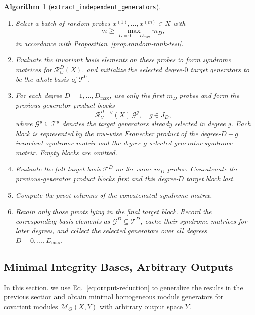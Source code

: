 \documentclass[11pt]{article}
\newcommand{\scG}{\mathcal{G}}
\newcommand{\scM}{\mathcal{M}}
\newcommand{\scR}{\mathcal{R}}
\newcommand{\scT}{\mathcal{T}}
\newtheorem{algorithm}[theorem]{Algorithm}
\theoremstyle{definition}
\begin{document}
\begin{algorithm}[\texttt{extract\_independent\_generators}]
\begin{enumerate}[label=\textbf{Step \arabic*.},leftmargin=2.8cm]
    \item Select a batch of random probes $x^{(1)},\dots,x^{(m)}\in X$ with
    \[
      m\ge \max_{D=0,\dots,D_{\max}} m_D,
    \]
    in accordance with Proposition~\ref{prop:random-rank-test}.

    \item Evaluate the invariant basis elements on these probes to form syndrome matrices for $\scR_G^D(X)$, and initialize the selected degree-$0$ target generators to be the whole basis of $\scT^0$.

    \item For each degree $D=1,\dots,D_{\max}$, use only the first $m_D$ probes and form the previous-generator product blocks
    \[
      \scR_G^{D-g}(X)\,\scG^g,
      \quad g\in J_D,
    \]
    where $\scG^g\subseteq\scT^g$ denotes the target generators already selected in degree $g$.
    Each block is represented by the row-wise Kronecker product of the degree-$D-g$ invariant syndrome matrix and the degree-$g$ selected-generator syndrome matrix.
    Empty blocks are omitted.

    \item Evaluate the full target basis $\scT^D$ on the same $m_D$ probes.
    Concatenate the previous-generator product blocks first and this degree-$D$ target block last.

    \item Compute the pivot columns of the concatenated syndrome matrix.

    \item Retain only those pivots lying in the final target block.
    Record the corresponding basis elements as $\scG^D\subseteq\scT^D$, cache their syndrome matrices for later degrees, and collect the selected generators over all degrees $D=0,\dots,D_{\max}$.
  \end{enumerate}
\end{algorithm}



\subsection{Minimal Integrity Bases, Arbitrary Outputs}\label{sec:arbitrary-generators}

In this section, we use Eq.~\eqref{eq:output-reduction} to generalize the results in the previous section and obtain minimal homogeneous module generators for covariant modules $\scM_G(X,Y)$ with arbitrary output space $Y$.
\end{document}
